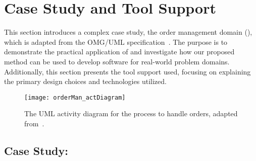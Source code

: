 \section{Case Study and Tool Support}
\label{sect:caseStudyToolSupport} %

This section introduces a complex case study, the order management domain (\orderman), which is adapted from the OMG/UML specification~\cite[p.~396]{omg_unified_2017}. The purpose is to demonstrate the practical application of \agl and investigate how our proposed method can be used to develop software for real-world problem domains. Additionally, this section presents the tool support used, focusing on explaining the primary design choices and technologies utilized.

\begin{figure*}[ht]
	\centering
	\texttt{[image: orderMan\_actDiagram]}
	\caption{The UML activity diagram for the process to handle orders, adapted from~\cite[p.~369]{omg_unified_2017}.} %
	\vspace{-0.2cm}
	\label{fig:orderMan_actDiagram}
\end{figure*}

\subsection{Case Study: \orderman}
\label{subsect:caseStudy} %

